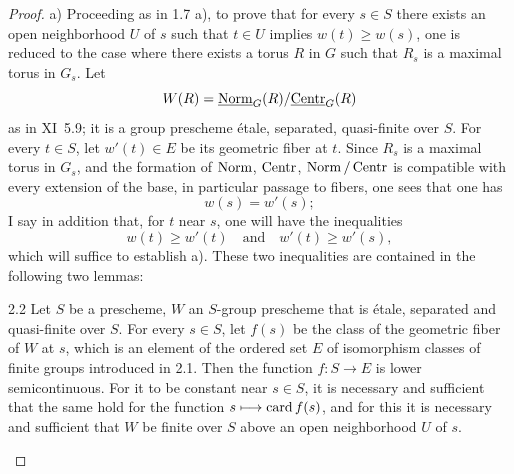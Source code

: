 \begin{proof}
a) Proceeding as in 1.7 a), to prove that for every $s\in S$ there exists an open neighborhood $U$ of $s$ such that $t\in U$ implies $w(t)\ge w(s)$, one is reduced to the case where there exists a torus $R$ in $G$ such that $R_s$ is a maximal torus in $G_s$. Let
\[
W(R)=\underline{\mathrm{Norm}}_G(R)/\underline{\mathrm{Centr}}_G(R)
\]
as in XI~5.9; it is a group prescheme étale, separated, quasi-finite over $S$. For every $t\in S$, let $w'(t)\in E$ be its geometric fiber at $t$. Since $R_s$ is a maximal torus in $G_s$, and the formation of $\operatorname{Norm}$, $\operatorname{Centr}$, $\operatorname{Norm}/\operatorname{Centr}$ is compatible with every extension of the base, in particular passage to fibers, one sees that one has
\[
w(s)=w'(s);
\]
I say in addition that, for $t$ near $s$, one will have the inequalities
\[
w(t)\ge w'(t)\quad\text{and}\quad w'(t)\ge w'(s),
\]
which will suffice to establish a). These two inequalities are contained in the following two lemmas:
\begin{lemma}{2.2}\label{XII.2.2}
Let $S$ be a prescheme, $W$ an $S$-group prescheme that is étale, separated and quasi-finite over $S$. For every $s\in S$, let $f(s)$ be the class of the geometric fiber of $W$ at $s$, which is an element of the ordered set $E$ of isomorphism classes of finite groups introduced in 2.1. Then the function $f:S\to E$ is lower semicontinuous. For it to be constant near $s\in S$, it is necessary and sufficient that the same hold for the function $s\longmapsto\operatorname{card}f(s)$, and for this it is necessary and sufficient that $W$ be finite over $S$ above an open neighborhood $U$ of $s$.
\end{lemma}

\end{proof}

